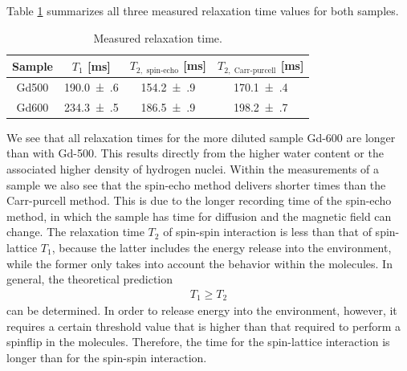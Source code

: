 Table \ref{tab:relax} summarizes all three measured relaxation time values for both samples.
\begin{table}[ht]
\centering
\begin{tabular}{cccc}
\toprule
Sample & $T_1$ [ms] & $T_{2,\text{ spin-echo}}$ [ms] & $T_{2,\text{ Carr-purcell}}$ [ms]\\
\midrule
Gd500 & \num{190.0(6)} & \num{154.2(9)} & \num{170.1(4)}\\
Gd600 & \num{234.3(5)} & \num{186.5(9)} & \num{198.2(7)}\\
\bottomrule
\end{tabular}
\caption{Measured relaxation time.}
\label{tab:relax}
\end{table}
We see that all relaxation times for the more diluted sample Gd-600 are longer than with Gd-500.
This results directly from the higher water content or the associated higher density of hydrogen nuclei.
Within the measurements of a sample we also see that the spin-echo method delivers shorter times than the Carr-purcell method.
This is due to the longer recording time of the spin-echo method, in which the sample has time for diffusion and the magnetic field can change.
The relaxation time $T_2$ of spin-spin interaction is less than that of spin-lattice $T_1$, because the latter includes the energy release into the environment, while the former only takes into account the behavior within the molecules.
In general, the theoretical prediction
\begin{align*}
T_1\geq T_2
\end{align*}
can be determined. 
In order to release energy into the environment, however, it requires a certain threshold value that is higher than that required to perform a spinflip in the molecules.
Therefore, the time for the spin-lattice interaction is longer than for the spin-spin interaction. 



